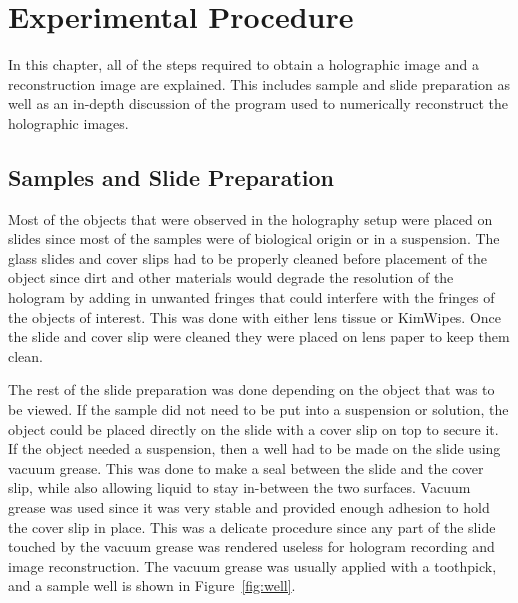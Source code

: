 %

\chapter{Experimental Procedure} \label{chap:Experimental}

In this chapter, all of the steps required to obtain a holographic image and
a reconstruction image are explained. This includes sample and slide
preparation as well as
an in-depth discussion of the program used to numerically reconstruct the holographic
images.

\section{Samples and Slide Preparation}

Most of the objects that were observed in the holography setup were placed on slides
%
%
since most of the samples were of biological origin or in a suspension. 
The glass slides and cover slips had to be properly cleaned before placement of
the object
since dirt and other materials would degrade the
resolution of the hologram by adding in unwanted fringes that could interfere
with the fringes of the objects of interest. This was done with either lens
tissue or KimWipes\texttrademark.
Once the slide and cover slip were cleaned they
were placed on lens paper to keep them clean.

The rest of the slide preparation was done depending on the object that was to be
viewed. If the sample did not need to be put into a suspension or solution,
the object could be placed directly on the slide with a cover slip on top to
secure it.
If the object needed a suspension, then a well had to be made on the slide
using vacuum grease.
This was done to make a seal between the
slide and the cover slip, while also allowing liquid to stay in-between the two
surfaces. Vacuum grease was used since it was very stable and provided enough
adhesion to hold the cover slip in place.
This was a delicate procedure since any part of the slide touched by the
vacuum grease was rendered useless for hologram recording and image reconstruction. The vacuum
grease was usually applied with a toothpick, and a
sample well is shown in Figure~\ref{fig:well}.

